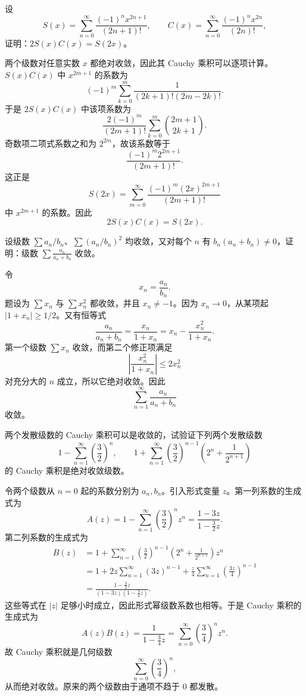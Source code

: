 \begin{xexercise}[13]
设
\[
S(x)=\sum_{n=0}^{\infty}\frac{(-1)^nx^{2n+1}}{(2n+1)!},\qquad C(x)=\sum_{n=0}^{\infty}\frac{(-1)^nx^{2n}}{(2n)!},
\]
证明：$2S(x)C(x)=S(2x)$。
\end{xexercise}
\begin{xsolution}
两个级数对任意实数 $x$ 都绝对收敛，因此其 Cauchy 乘积可以逐项计算。$S(x)C(x)$ 中 $x^{2m+1}$ 的系数为
\[
 (-1)^m\sum_{k=0}^{m}\frac1{(2k+1)!(2m-2k)!}.
\]
于是 $2S(x)C(x)$ 中该项系数为
\[
 \frac{2(-1)^m}{(2m+1)!}
 \sum_{k=0}^{m}\binom{2m+1}{2k+1}.
\]
奇数项二项式系数之和为 $2^{2m}$，故该系数等于
\[
 \frac{(-1)^m2^{2m+1}}{(2m+1)!}.
\]
这正是
\[
 S(2x)=\sum_{m=0}^{\infty}\frac{(-1)^m(2x)^{2m+1}}{(2m+1)!}
\]
中 $x^{2m+1}$ 的系数。因此
\[
 \boxed{2S(x)C(x)=S(2x)}.
\]
\end{xsolution}


\begin{xexercise}[14]
设级数 $\sum a_n/b_n$、$\sum(a_n/b_n)^2$ 均收敛，又对每个 $n$ 有 $b_n(a_n+b_n)\neq0$，证明：级数 $\sum\frac{a_n}{a_n+b_n}$ 收敛。
\end{xexercise}
\begin{xsolution}
令
\[
 x_n=\frac{a_n}{b_n}.
\]
题设为 $\sum x_n$ 与 $\sum x_n^2$ 都收敛，并且 $x_n\neq-1$。因为 $x_n\to0$，从某项起 $|1+x_n|\geq1/2$。又有恒等式
\[
 \frac{a_n}{a_n+b_n}
 =\frac{x_n}{1+x_n}
 =x_n-\frac{x_n^2}{1+x_n}.
\]
第一个级数 $\sum x_n$ 收敛，而第二个修正项满足
\[
 \left|\frac{x_n^2}{1+x_n}\right|\leq2x_n^2
\]
对充分大的 $n$ 成立，所以它绝对收敛。因此
\[
 \sum_{n=1}^{\infty}\frac{a_n}{a_n+b_n}
\]
收敛。
\end{xsolution}


\begin{xexercise}[15]
两个发散级数的 Cauchy 乘积可以是收敛的，试验证下列两个发散级数
\[
1-\sum_{n=1}^{\infty}\left(\frac32\right)^n,
\qquad
1+\sum_{n=1}^{\infty}\left(\frac32\right)^{n-1}\left(2^n+\frac1{2^{n+1}}\right)
\]
的 Cauchy 乘积是绝对收敛级数。
\end{xexercise}
\begin{xsolution}
令两个级数从 $n=0$ 起的系数分别为 $a_n,b_n$。引入形式变量 $z$。第一列系数的生成式为
\[
 A(z)=1-\sum_{n=1}^{\infty}\left(\frac32\right)^nz^n
 =\frac{1-3z}{1-\frac32z}.
\]
第二列系数的生成式为
\[
 \begin{aligned}
 B(z)
 &=1+\sum_{n=1}^{\infty}\left(\frac32\right)^{n-1}
 \left(2^n+\frac1{2^{n+1}}\right)z^n\\
 &=1+2z\sum_{n=1}^{\infty}(3z)^{n-1}
 +\frac z4\sum_{n=1}^{\infty}\left(\frac{3z}{4}\right)^{n-1}\\
 &=\frac{1-\frac32z}{(1-3z)(1-\frac34z)}.
 \end{aligned}
\]
这些等式在 $|z|$ 足够小时成立，因此形式幂级数系数也相等。于是 Cauchy 乘积的生成式为
\[
 A(z)B(z)=\frac1{1-\frac34z}
 =\sum_{n=0}^{\infty}\left(\frac34\right)^nz^n.
\]
故 Cauchy 乘积就是几何级数
\[
 \sum_{n=0}^{\infty}\left(\frac34\right)^n,
\]
从而绝对收敛。原来的两个级数由于通项不趋于 $0$ 都发散。
\end{xsolution}


